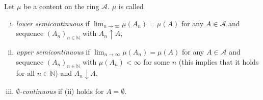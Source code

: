 \begin{definition}
    Let $\mu$ be a content on the ring $\mathcal{A}$. $\mu$ is called
    \begin{enumerate}[(i)]
        \item \textit{lower semicontinuous} if $\lim_{n\to\infty}\mu(A_n)=\mu(A)$ for any $A\in\mathcal{A}$ and sequence $(A_n)_{n\in\mathbb{N}}$ with $A_n\uparrow A$,
        \item \textit{upper semicontinuous} if $\lim_{n\to\infty}\mu(A_n)=\mu(A)$ for any $A\in\mathcal{A}$ and sequence $(A_n)_{n\in\mathbb{N}}$ with $\mu(A_n)<\infty$ for some $n$ (this implies that it holds for all $n\in\mathbb{N}$) and $A_n\downarrow A$,
        \item \textit{$\emptyset$-continuous} if (ii) holds for $A=\emptyset$.
    \end{enumerate}
\end{definition}


